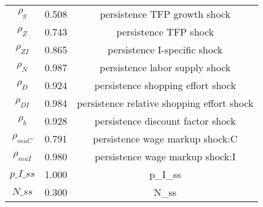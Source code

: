 \begin{center}
\begin{longtable}{ccc}
${\rho_g}$ 	 & 	 0.508 	 & 	 persistence TFP growth shock\\
${\rho_Z}$ 	 & 	 0.743 	 & 	 persistence TFP shock\\
${\rho_{ZI}}$ 	 & 	 0.865 	 & 	 persistence I-specific shock\\
${\rho_N}$ 	 & 	 0.987 	 & 	 persistence labor supply shock\\
${\rho_D}$ 	 & 	 0.924 	 & 	 persistence shopping effort shock\\
${\rho_{DI}}$ 	 & 	 0.984 	 & 	 persistence relative shopping effort shock\\
${\rho_b}$ 	 & 	 0.928 	 & 	 persistence discount factor shock\\
${\rho_{muC}}$ 	 & 	 0.791 	 & 	 persistence wage markup shock:C\\
${\rho_{muI}}$ 	 & 	 0.980 	 & 	 persistence wage markup shock:I\\
$p\_I\_ss$ 	 & 	 1.000 	 & 	 p\_I\_ss\\
$N\_ss$ 	 & 	 0.300 	 & 	 N\_ss\\
\bottomrule%
\end{longtable}
\end{center}
